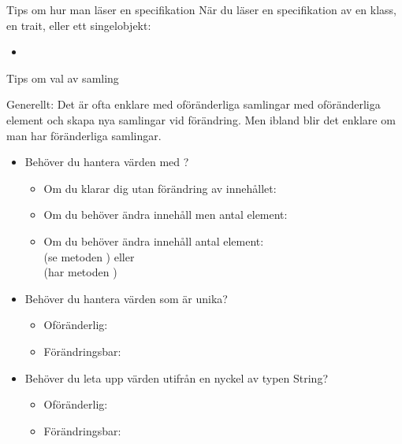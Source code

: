 \begin{Slide}{Tips om hur man läser en specifikation}\SlideFontSmall
När du läser en specifikation av en klass, en trait, eller ett singelobjekt:
\begin{itemize}
\item 
\end{itemize}
\end{Slide}


\begin{Slide}{Tips om val av samling}\SlideFontSmall

Generellt: Det är ofta enklare med oföränderliga samlingar med oföränderliga element och skapa nya samlingar vid förändring. Men ibland blir det enklare om man har föränderliga samlingar.

\begin{itemize}
\item Behöver du hantera värden  med ?
\begin{itemize}\SlideFontTiny
\item Om du klarar dig utan förändring av innehållet:\\ 
\item Om du behöver ändra innehåll men  antal element: \\  
\item Om du behöver ändra innehåll  antal element: 
\\  (se metoden ) eller \\  (har metoden )
\end{itemize}

\item Behöver du hantera värden  som är unika?
\begin{itemize}\SlideFontTiny
\item Oföränderlig: 
\item Förändringsbar: 
\end{itemize}

\item Behöver du leta upp värden  utifrån en nyckel av typen String?
\begin{itemize}\SlideFontTiny
\item Oföränderlig: 
\item Förändringsbar: 
\end{itemize}


\end{itemize}
\end{Slide}

